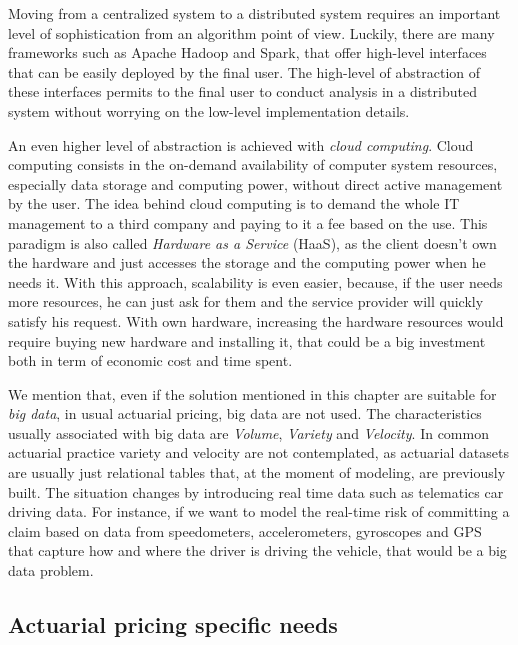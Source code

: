 \documentclass[a4paper, nobind]{templates/ociamthesis}
\theoremstyle{definition}
\theoremstyle{definition}
\theoremstyle{definition}
\theoremstyle{remark}
\begin{document}
Moving from a centralized system to a distributed system requires an important level of sophistication from an algorithm point of view. Luckily, there are many frameworks such as Apache Hadoop and Spark, that offer high-level interfaces that can be easily deployed by the final user. The high-level of abstraction of these interfaces permits to the final user to conduct analysis in a distributed system without worrying on the low-level implementation details.

An even higher level of abstraction is achieved with \emph{cloud computing}. Cloud computing consists in the on-demand availability of computer system resources, especially data storage and computing power, without direct active management by the user. The idea behind cloud computing is to demand the whole IT management to a third company and paying to it a fee based on the use. This paradigm is also called \emph{Hardware as a Service} (HaaS), as the client doesn't own the hardware and just accesses the storage and the computing power when he needs it. With this approach, scalability is even easier, because, if the user needs more resources, he can just ask for them and the service provider will quickly satisfy his request. With own hardware, increasing the hardware resources would require buying new hardware and installing it, that could be a big investment both in term of economic cost and time spent.

We mention that, even if the solution mentioned in this chapter are suitable for \emph{big data}, in usual actuarial pricing, big data are not used. The characteristics usually associated with big data are \emph{Volume}, \emph{Variety} and \emph{Velocity}. In common actuarial practice variety and velocity are not contemplated, as actuarial datasets are usually just relational tables that, at the moment of modeling, are previously built. The situation changes by introducing real time data such as telematics car driving data. For instance, if we want to model the real-time risk of committing a claim based on data from speedometers, accelerometers, gyroscopes and GPS that capture how and where the driver is driving the vehicle, that would be a big data problem.

\hypertarget{chap:actuarial-pricing-specific-needs}{%
\subsection{Actuarial pricing specific needs}\label{chap:actuarial-pricing-specific-needs}}
\end{document}
